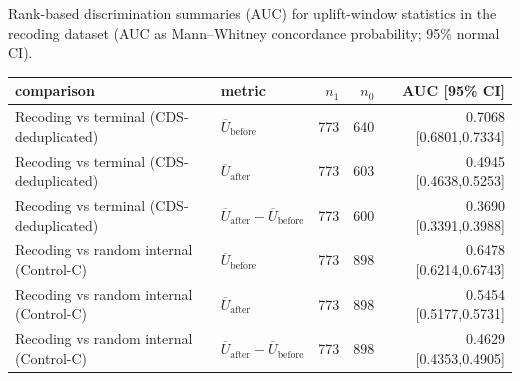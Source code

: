 Rank-based discrimination summaries (AUC) for uplift-window statistics in the recoding dataset (AUC as Mann--Whitney concordance probability; 95\% normal CI).

\begin{center}
\small
\setlength{\tabcolsep}{6pt}
\renewcommand{\arraystretch}{1.15}
\begin{tabular}{l l r r r}
\toprule
comparison & metric & $n_1$ & $n_0$ & AUC [95\% CI] \\
\midrule
Recoding vs terminal (CDS-deduplicated) & $\overline{U}_{\mathrm{before}}$ & 773 & 640 & 0.7068 [0.6801,0.7334] \\
Recoding vs terminal (CDS-deduplicated) & $\overline{U}_{\mathrm{after}}$ & 773 & 603 & 0.4945 [0.4638,0.5253] \\
Recoding vs terminal (CDS-deduplicated) & $\overline{U}_{\mathrm{after}}-\overline{U}_{\mathrm{before}}$ & 773 & 600 & 0.3690 [0.3391,0.3988] \\
Recoding vs random internal (Control-C) & $\overline{U}_{\mathrm{before}}$ & 773 & 898 & 0.6478 [0.6214,0.6743] \\
Recoding vs random internal (Control-C) & $\overline{U}_{\mathrm{after}}$ & 773 & 898 & 0.5454 [0.5177,0.5731] \\
Recoding vs random internal (Control-C) & $\overline{U}_{\mathrm{after}}-\overline{U}_{\mathrm{before}}$ & 773 & 898 & 0.4629 [0.4353,0.4905] \\
\bottomrule
\end{tabular}
\end{center}

